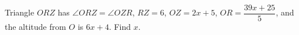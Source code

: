 Triangle $ORZ$ has $\angle ORZ=\angle OZR$, $RZ=6$, $OZ=2x+5$, $OR=\dfrac{39x+25}5$, and the altitude from $O$ is $6x+4$. Find $x$.
